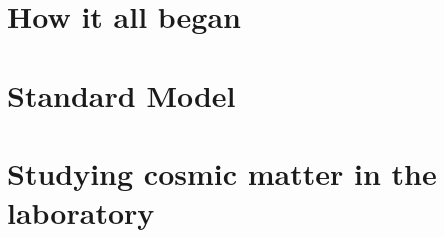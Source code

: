 \section{How it all began}
\section{Standard Model}
\section{Studying cosmic matter in the laboratory}


